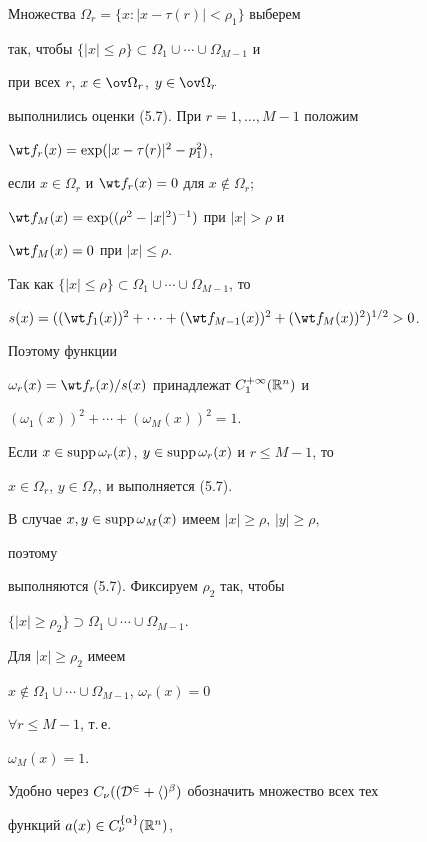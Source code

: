 \begin{pf} 


Множества $\Omega_r=\{x:|x-\tau(r)|<\rho_1\}$ выберем  


так, чтобы $\{|x|\le\rho\}\subset\Omega_1\cup\dotsb\cup\Omega_{M-1}$ и 


при всех $r$, $x\in\ov\Omega_r$, $y\in\ov\Omega_r$ 


выполнились оценки (5.7). При $r=1,\dotsc,M-1$ положим 


$\wt f_r(x)=\exp(|x-\tau(r)|^2-p^2_1)$, 


если $x\in\Omega_r$ и $\wt f_r(x)=0$ для $x\notin\Omega_r$;


$\wt f_M(x)=\exp((\rho^2-|x|^2)^{-1})$ при $|x|>\rho$ и 


$\wt f_M(x)=0$ при $|x|\le\rho$. 


Так как $\{|x|\le\rho\}\subset\Omega_1\cup\dotsb\cup\Omega_{M-1}$, то 


$s(x)=((\wt f_1(x))^2+\dotsb+(\wt f_{M-1}(x))^2+ 


(\wt f_M(x))^2)^{1/2}>0$. 


Поэтому функции  


$\omega_r(x)=\wt f_r(x)/s(x)$ принадлежат $C^{+\infty}_1(\Bbb R^n)$ и 


$(\omega_1(x))^2+\dotsb+(\omega_M(x))^2=1$. 


Если $x\in\operatorname{supp}\omega_r(x)$, $y\in\operatorname{supp}\omega_r(x)$ и $r\le M-1$, то 


$x\in\Omega_r$, $y\in\Omega_r$, и выполняется (5.7). 


В случае $x,y\in\operatorname{supp}\omega_M(x)$ имеем $|x|\ge\rho$, $|y|\ge\rho$, 


поэтому  


выполняются (5.7). Фиксируем $\rho_2$ так, чтобы 


$\{|x|\ge\rho_2\}\supset\Omega_1\cup\dotsb\cup\Omega_{M-1}$. 


Для $|x|\ge\rho_2$ имеем 


$x\notin\Omega_1\cup\dotsb\cup\Omega_{M-1}$, $\omega_r(x)=0$ 


$\forall r\le M-1$, т.\,е. 


$\omega_M(x)=1$. 


\end{pf} 


 


Удобно через $C_\nu((\cal D^2+h)^\beta)$ обозначить множество всех тех 


функций $a(x)\in C^{\{\alpha\}}_\nu(\Bbb R^n)$, 


